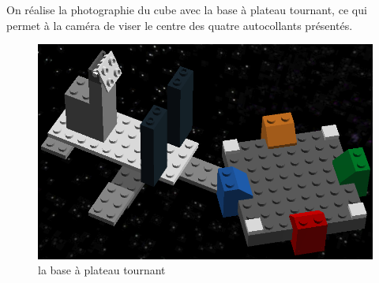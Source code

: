 \documentclass[11pt,a4paper]{article}
\begin{document}
	On réalise la photographie du cube avec la base à plateau tournant, ce qui permet à la caméra de viser le centre des quatre autocollants présentés.
	\begin{figure}[h]
	\centering
	\includegraphics[scale=0.3]{support2x2x2raspi}
	\caption{la base à plateau tournant}
\end{figure}
\end{document}
